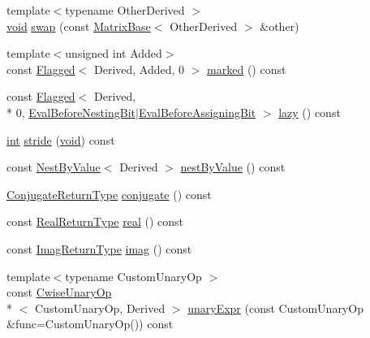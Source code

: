 \begin{DoxyCompactItemize}
{\footnotesize template$<$typename Other\-Derived $>$ }\\\hyperlink{group___u_a_v_objects_plugin_ga444cf2ff3f0ecbe028adce838d373f5c}{void} \hyperlink{class_matrix_base_ac5b6e442c6dc22adbe18a6e72913cf1f}{swap} (const \hyperlink{class_matrix_base}{Matrix\-Base}$<$ Other\-Derived $>$ \&other)
\item 
{\footnotesize template$<$unsigned int Added$>$ }\\const \hyperlink{class_flagged}{Flagged}$<$ Derived, Added, 0 $>$ \hyperlink{class_matrix_base_ae9b798d2c9da0080c4ce3b24ebc4d169}{marked} () const 
\item 
const \hyperlink{class_flagged}{Flagged}$<$ Derived, \\*
0, \hyperlink{group__flags_gaf8ad6e2956f7368b8e3f7407e2319e63}{Eval\-Before\-Nesting\-Bit}$|$\hyperlink{group__flags_gadc8925e67a5a54bd479d6f587112e19a}{Eval\-Before\-Assigning\-Bit} $>$ \hyperlink{class_matrix_base_a433ef551c2d9be69772c44735bc2b710}{lazy} () const 
\item 
\hyperlink{ioapi_8h_a787fa3cf048117ba7123753c1e74fcd6}{int} \hyperlink{class_matrix_base_af1fc2909ca6bf808cea951397038bd3f}{stride} (\hyperlink{group___u_a_v_objects_plugin_ga444cf2ff3f0ecbe028adce838d373f5c}{void}) const 
\item 
const \hyperlink{class_nest_by_value}{Nest\-By\-Value}$<$ Derived $>$ \hyperlink{class_matrix_base_ae0c303f9b5159f22a338d605eef2ea40}{nest\-By\-Value} () const 
\item 
\hyperlink{class_matrix_base_a91f43c00ced2c79a68df37e6251b0db5}{Conjugate\-Return\-Type} \hyperlink{class_matrix_base_a7682b6d1b0aa7ef8ecf50261ae23c754}{conjugate} () const 
\item 
const \hyperlink{class_matrix_base_a02863bf8c3ddaf96fda6491811c3ec96}{Real\-Return\-Type} \hyperlink{class_matrix_base_a3d778489144090d4d1e0c482b723321e}{real} () const 
\item 
const \hyperlink{class_matrix_base_a68872f4e92191ab5c7d927329aa6d53c}{Imag\-Return\-Type} \hyperlink{class_matrix_base_ac082e5466d86cef16c6805730508b96c}{imag} () const 
\item 
{\footnotesize template$<$typename Custom\-Unary\-Op $>$ }\\const \hyperlink{class_cwise_unary_op}{Cwise\-Unary\-Op}\\*
$<$ Custom\-Unary\-Op, Derived $>$ \hyperlink{class_matrix_base_a10188fe54ffbf2b3cc4805eba39327cb}{unary\-Expr} (const Custom\-Unary\-Op \&func=Custom\-Unary\-Op()) const 
\item 

\end{DoxyCompactItemize}
